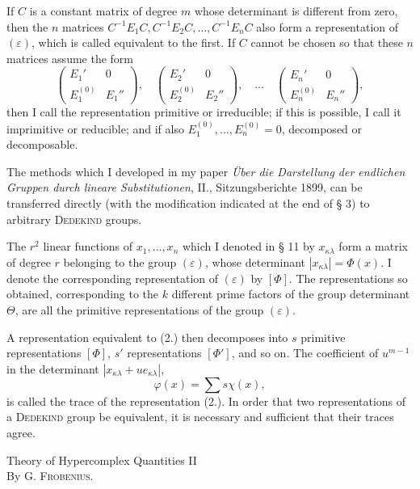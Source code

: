 \documentclass[11pt]{article}
\newcommand{\eps}{\varepsilon}
\newcommand{\frobtitle}[1]{\begin{center}{\Large #1}\\[0.75em]By G. \textsc{Frobenius}.\end{center}\vspace{0.5em}}
\begin{document}
If $C$ is a constant matrix of degree $m$ whose determinant is different from zero, then the $n$ matrices $C^{-1}E_1C,C^{-1}E_2C,\ldots,C^{-1}E_nC$ also form a representation of $(\eps)$, which is called equivalent to the first. If $C$ cannot be chosen so that these $n$ matrices assume the form
\[
 \begin{pmatrix}E_1'&0\\ E_1^{(0)}&E_1''\end{pmatrix},
 \quad
 \begin{pmatrix}E_2'&0\\ E_2^{(0)}&E_2''\end{pmatrix},
 \quad \ldots \quad
 \begin{pmatrix}E_n'&0\\ E_n^{(0)}&E_n''\end{pmatrix},
\]
then I call the representation primitive or irreducible; if this is possible, I call it imprimitive or reducible; and if also $E_1^{(0)},\ldots,E_n^{(0)}=0$, decomposed or decomposable.

The methods which I developed in my paper \emph{Über die Darstellung der endlichen Gruppen durch lineare Substitutionen}, II., Sitzungsberichte 1899, can be transferred directly (with the modification indicated at the end of § 3) to arbitrary \textsc{Dedekind} groups.

The $r^2$ linear functions of $x_1,\ldots,x_n$ which I denoted in § 11 by $x_{\kappa\lambda}$ form a matrix of degree $r$ belonging to the group $(\eps)$, whose determinant $|x_{\kappa\lambda}|=\Phi(x)$. I denote the corresponding representation of $(\eps)$ by $[\Phi]$. The representations so obtained, corresponding to the $k$ different prime factors of the group determinant $\Theta$, are all the primitive representations of the group $(\eps)$.

A representation equivalent to (2.) then decomposes into $s$ primitive representations $[\Phi]$, $s'$ representations $[\Phi']$, and so on. The coefficient of $u^{m-1}$ in the determinant $|x_{\kappa\lambda}+ue_{\kappa\lambda}|$,
\[
 \varphi(x)=\sum s\chi(x),
\]
is called the trace of the representation (2.). In order that two representations of a \textsc{Dedekind} group be equivalent, it is necessary and sufficient that their traces agree.

\clearpage

\frobtitle{Theory of Hypercomplex Quantities II}
\end{document}
